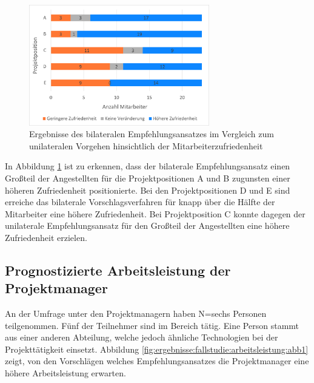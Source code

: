 \begin{figure}[h]
	\centering
	\includegraphics[width=0.7\textwidth]{gfx/zufriedenheit-projekte.png}	
	\caption{Ergebnisse des bilateralen Empfehlungsansatzes im Vergleich zum unilateralen Vorgehen hinsichtlich der Mitarbeiterzufriedenheit}
	\label{fig:ergebnisse:analyse:abb7}
\end{figure}

In Abbildung \ref{fig:ergebnisse:analyse:abb7} ist zu erkennen, dass der bilaterale Empfehlungsansatz einen Großteil der Angestellten für die Projektpositionen A und B zugunsten einer höheren Zufriedenheit positionierte. Bei den Projektpositionen D und E sind erreiche das bilaterale Vorschlagsverfahren für knapp über die Hälfte der Mitarbeiter eine höhere Zufriedenheit. Bei Projektposition C konnte dagegen der unilaterale Empfehlungsansatz für den Großteil der Angestellten eine höhere Zufriedenheit erzielen.

\subsection{Prognostizierte Arbeitsleistung der Projektmanager}
\label{ch:ergebnisse:fallstudie:arbeitsleistung}
An der Umfrage unter den Projektmanagern haben N=sechs Personen teilgenommen. Fünf der Teilnehmer sind im Bereich \JES tätig. Eine Person stammt aus einer anderen Abteilung, welche jedoch ähnliche Technologien bei der Projekttätigkeit einsetzt. Abbildung \ref{fig:ergebnisse:fallstudie:arbeitsleistung:abb1} zeigt, von den Vorschlägen welches Empfehlungsansatzes die Projektmanager eine höhere Arbeitsleistung erwarten.

